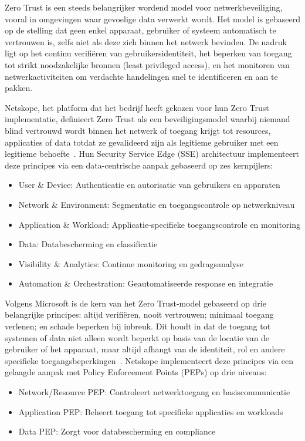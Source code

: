 Zero Trust is een steeds belangrijker wordend model voor netwerkbeveiliging, vooral in omgevingen waar gevoelige data verwerkt wordt. 
Het model is gebaseerd op de stelling dat geen enkel apparaat, gebruiker of systeem automatisch te vertrouwen is, zelfs niet als deze zich binnen het netwerk bevinden. 
De nadruk ligt op het continu verifiëren van gebruikersidentiteit, het beperken van toegang tot strikt noodzakelijke bronnen (least privileged access), en het monitoren van netwerkactiviteiten om verdachte handelingen snel te identificeren en aan te pakken.

Netskope, het platform dat het bedrijf heeft gekozen voor hun Zero Trust implementatie, definieert Zero Trust als een beveiligingsmodel waarbij niemand blind vertrouwd wordt binnen het netwerk of toegang krijgt tot resources, applicaties of data totdat ze gevalideerd zijn als legitieme gebruiker met een legitieme behoefte~\autocite{Netskope2020}. Hun Security Service Edge (SSE) architectuur implementeert deze principes via een data-centrische aanpak gebaseerd op zes kernpijlers:

\begin{itemize}
  \item User \& Device: Authenticatie en autorisatie van gebruikers en apparaten
  \item Network \& Environment: Segmentatie en toegangscontrole op netwerkniveau
  \item Application \& Workload: Applicatie-specifieke toegangscontrole en monitoring
  \item Data: Databescherming en classificatie
  \item Visibility \& Analytics: Continue monitoring en gedragsanalyse
  \item Automation \& Orchestration: Geautomatiseerde response en integratie
\end{itemize}

Volgens Microsoft is de kern van het Zero Trust-model gebaseerd op drie belangrijke principes: altijd verifiëren, nooit vertrouwen; minimaal toegang verlenen; en schade beperken bij inbreuk. Dit houdt in dat de toegang tot systemen of data niet alleen wordt beperkt op basis van de locatie van de gebruiker of het apparaat, maar altijd afhangt van de identiteit, rol en andere specifieke toegangsbeperkingen~\autocite{Microsoft2024}. Netskope implementeert deze principes via een gelaagde aanpak met Policy Enforcement Points (PEPs) op drie niveaus:

\begin{itemize}
  \item Network/Resource PEP: Controleert netwerktoegang en basiscommunicatie
  \item Application PEP: Beheert toegang tot specifieke applicaties en workloads
  \item Data PEP: Zorgt voor databescherming en compliance
\end{itemize}

